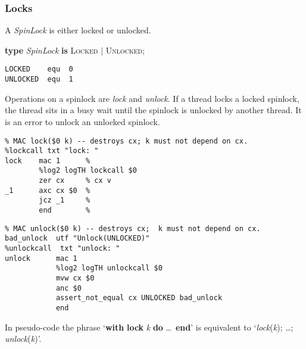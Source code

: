 \subsubsection{Locks}

A \emph{SpinLock} is either locked or unlocked.

\begin{tabbing}
\indents
\vb\>\textbf{type} \emph{SpinLock} \textbf{is} \textsc{Locked} $|$ \textsc{Unlocked};
\end{tabbing}

{\small
\begin{verbatim}
LOCKED    equ  0
UNLOCKED  equ  1
\end{verbatim}}

Operations on a spinlock are \emph{lock} and \emph{unlock}. If a thread locks a locked spinlock, the thread sits in a busy wait until the spinlock is unlocked by another thread. It is an error to unlock an unlocked spinlock.

\begin{tabbing}
\indents
{}
\fin
\end{tabbing}

{\small
\begin{verbatim}
% MAC lock($0 k) -- destroys cx; k must not depend on cx.
%lockcall txt "lock: "
lock    mac 1      %
        %log2 logTH lockcall $0
        zer cx     % cx v
_1      axc cx $0  %
        jcz _1     %
        end        %
\end{verbatim}}

\begin{tabbing}
\indents
{}
\fin
\end{tabbing}

{\small
\begin{verbatim}
% MAC unlock($0 k) -- destroys cx;  k must not depend on cx.
bad_unlock  utf "Unlock(UNLOCKED)"
%unlockcall  txt "unlock: "
unlock      mac 1
            %log2 logTH unlockcall $0
            mvw cx $0
            anc $0
            assert_not_equal cx UNLOCKED bad_unlock
            end
\end{verbatim}}

In pseudo-code the phrase `\textbf{with} \textbf{lock} \emph{k} \textbf{do} \dots\ \textbf{end}' is equivalent to `\emph{lock}(\emph{k}); \dots; \emph{unlock}(\emph{k})'.





